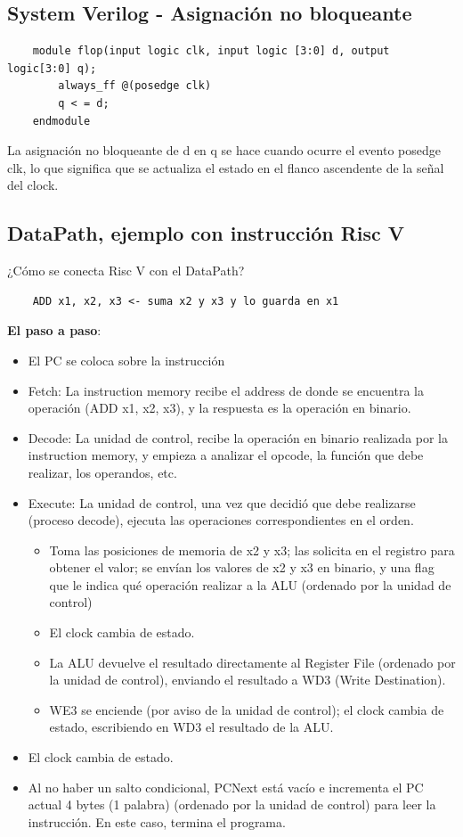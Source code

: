 \documentclass[10pt,a4paper]{article}
\begin{document}
\subsection*{System Verilog - Asignación no bloqueante}
\label{subsec:SVL_bloques_clk}
\begin{lstlisting}
    module flop(input logic clk, input logic [3:0] d, output logic[3:0] q);
        always_ff @(posedge clk)
        q < = d;
    endmodule
\end{lstlisting}
La asignación no bloqueante de d en q se hace cuando ocurre el evento posedge clk, lo que significa que se actualiza el estado en el flanco ascendente de la señal del clock.
\subsection*{DataPath, ejemplo con instrucción Risc V}
\label{subsec:datapath_example}
¿Cómo se conecta Risc V con el DataPath? 
\begin{lstlisting}
    ADD x1, x2, x3 <- suma x2 y x3 y lo guarda en x1
\end{lstlisting}
\textbf{El paso a paso}: 
\begin{itemize}
    \item El PC se coloca sobre la instrucción
    \item Fetch: La instruction memory recibe el address de donde se encuentra la operación (ADD x1, x2, x3), y la respuesta es la operación en binario.
    \item Decode: La unidad de control, recibe la operación en binario realizada por la instruction memory, y empieza a analizar el opcode, la función que debe realizar, los operandos, etc.
    \item Execute: La unidad de control, una vez que decidió que debe realizarse (proceso decode), ejecuta las operaciones correspondientes en el orden.
    \begin{itemize}
        \item Toma las posiciones de memoria de x2 y x3; las solicita en el registro para obtener el valor; se envían los valores de x2 y x3 en binario, y una flag que le indica qué operación realizar a la ALU (ordenado por la unidad de control)
        \item El clock cambia de estado. 
        \item La ALU devuelve el resultado directamente al Register File (ordenado por la unidad de control), enviando el resultado a WD3 (Write Destination).
        \item WE3 se enciende (por aviso de la unidad de control); el clock cambia de estado, escribiendo en WD3 el resultado de la ALU.
    \end{itemize}
    \item El clock cambia de estado. 
    \item Al no haber un salto condicional, PCNext está vacío e incrementa el PC actual 4 bytes (1 palabra) (ordenado por la unidad de control) para leer la instrucción. En este caso, termina el programa. 
\end{itemize}
\end{document}
